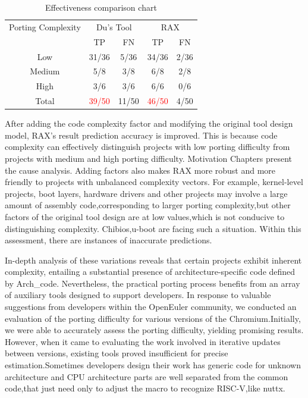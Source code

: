 \documentclass[sigconf,screen,review,anonymous]{acmart}
\begin{document}
\begin{table}
  \caption{Effectiveness comparison chart}
  \label{tab:effectiveness}
  \begin{tabular}{ccccc}
    \toprule
    Porting Complexity & \multicolumn{2}{c}{Du's Tool} & \multicolumn{2}{c}{RAX} \\
     & TP & FN & TP & FN \\
    \midrule
    Low &31/36 & 5/36 & 34/36 & 2/36 \\
    Medium & 5/8 & 3/8 & 6/8 & 2/8 \\
    High & 3/6 & 3/6 & 6/6 & 0/6 \\
    \midrule
    Total & \textcolor{red}{39/50} & 11/50& \textcolor{red}{46/50} & 4/50 \\
      \bottomrule
\end{tabular}
\end{table}

After adding the code complexity factor and modifying the original tool design model, RAX's result prediction accuracy is improved.
This is because code complexity can effectively distinguish projects with low porting difficulty from projects with medium and high porting difficulty.
Motivation Chapters present the cause analysis.
Adding factors also makes RAX more robust and more friendly to projects with unbalanced complexity vectors.
For example, kernel-level projects, boot layers, hardware drivers and other projects may involve a large amount of assembly code,corresponding to larger porting complexity,but other factors of the original tool design are at low values,which is not conducive to distinguishing complexity.
Chibios,u-boot are facing such a situation.
Within this assessment, there are instances of inaccurate predictions.


In-depth analysis of these variations reveals that certain projects exhibit inherent complexity, entailing a substantial presence of architecture-specific code defined by Arch\_code.
Nevertheless, the practical porting process benefits from an array of auxiliary tools designed to support developers. In response to valuable suggestions from developers within the OpenEuler community, we conducted an evaluation of the porting difficulty for various versions of the Chromium.Initially, we were able to accurately assess the porting difficulty, yielding promising results. However, when it came to evaluating the work involved in iterative updates between versions, existing tools proved insufficient for precise estimation.Sometimes developers design their work has generic code for unknown architecture and CPU architecture parts are well separated from the common code,that just need only to adjust the macro to recognize RISC-V,like nuttx.
\end{document}
